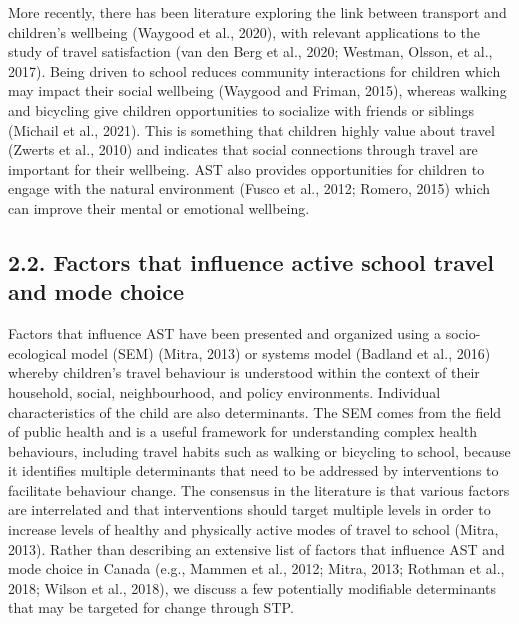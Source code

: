 \documentclass[]{elsarticle} %
\begin{document}
More recently, there has been literature exploring the link between
transport and children's wellbeing (Waygood et al., 2020), with relevant
applications to the study of travel satisfaction (van den Berg et al.,
2020; Westman, Olsson, et al., 2017). Being driven to school reduces
community interactions for children which may impact their social
wellbeing (Waygood and Friman, 2015), whereas walking and bicycling give
children opportunities to socialize with friends or siblings (Michail et
al., 2021). This is something that children highly value about travel
(Zwerts et al., 2010) and indicates that social connections through
travel are important for their wellbeing. AST also provides
opportunities for children to engage with the natural environment (Fusco
et al., 2012; Romero, 2015) which can improve their mental or emotional
wellbeing.

\hypertarget{factors-that-influence-active-school-travel-and-mode-choice}{%
\subsection{2.2. Factors that influence active school travel and mode
choice}\label{factors-that-influence-active-school-travel-and-mode-choice}}

Factors that influence AST have been presented and organized using a
socio-ecological model (SEM) (Mitra, 2013) or systems model (Badland et
al., 2016) whereby children's travel behaviour is understood within the
context of their household, social, neighbourhood, and policy
environments. Individual characteristics of the child are also
determinants. The SEM comes from the field of public health and is a
useful framework for understanding complex health behaviours, including
travel habits such as walking or bicycling to school, because it
identifies multiple determinants that need to be addressed by
interventions to facilitate behaviour change. The consensus in the
literature is that various factors are interrelated and that
interventions should target multiple levels in order to increase levels
of healthy and physically active modes of travel to school (Mitra,
2013). Rather than describing an extensive list of factors that
influence AST and mode choice in Canada (e.g., Mammen et al., 2012;
Mitra, 2013; Rothman et al., 2018; Wilson et al., 2018), we discuss a
few potentially modifiable determinants that may be targeted for change
through STP.
\end{document}
